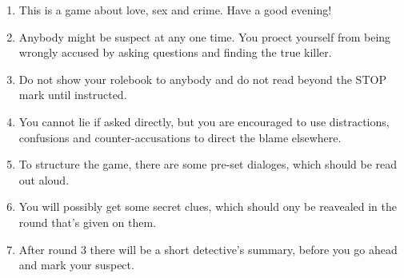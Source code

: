 \begin{enumerate}
\item This is a game about love, sex and crime. Have a good evening!
\item Anybody might be suspect at any one time. You proect yourself from being wrongly accused by asking questions and finding the true killer.
\item Do not show your rolebook to anybody and do not read beyond the STOP mark until instructed.
\item You cannot lie if asked directly, but you are encouraged to use distractions, confusions and counter-accusations to direct the blame elsewhere.
\item To structure the game, there are some pre-set dialoges, which should be read out aloud.
\item You will possibly get some secret clues, which should ony be reavealed in the round that's given on them.
\item After round 3 there will be a short detective's summary, before you go ahead and mark your suspect.

\end{enumerate}
